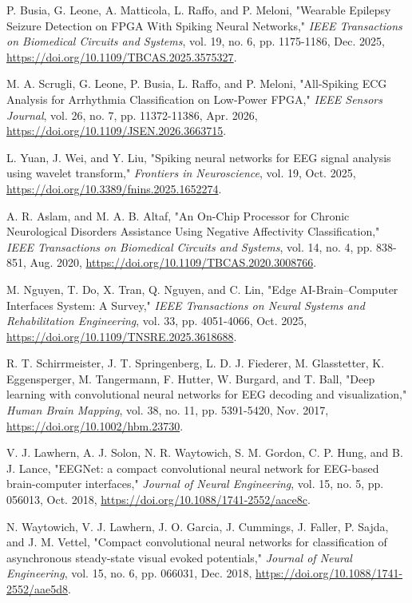  P. Busia, G. Leone, A. Matticola, L. Raffo, and P. Meloni, "Wearable Epilepsy Seizure Detection on FPGA With Spiking Neural Networks," \textit{IEEE Transactions on Biomedical Circuits and Systems}, vol. 19, no. 6, pp. 1175-1186, Dec. 2025, \url{https://doi.org/10.1109/TBCAS.2025.3575327}.

 M. A. Scrugli, G. Leone, P. Busia, L. Raffo, and P. Meloni, "All-Spiking ECG Analysis for Arrhythmia Classification on Low-Power FPGA," \textit{IEEE Sensors Journal}, vol. 26, no. 7, pp. 11372-11386, Apr. 2026, \url{https://doi.org/10.1109/JSEN.2026.3663715}.

 L. Yuan, J. Wei, and Y. Liu, "Spiking neural networks for EEG signal analysis using wavelet transform," \textit{Frontiers in Neuroscience}, vol. 19, Oct. 2025, \url{https://doi.org/10.3389/fnins.2025.1652274}.

 A. R. Aslam, and M. A. B. Altaf, "An On-Chip Processor for Chronic Neurological Disorders Assistance Using Negative Affectivity Classification," \textit{IEEE Transactions on Biomedical Circuits and Systems}, vol. 14, no. 4, pp. 838-851, Aug. 2020, \url{https://doi.org/10.1109/TBCAS.2020.3008766}.

 M. Nguyen, T. Do, X. Tran, Q. Nguyen, and C. Lin, "Edge AI-Brain–Computer Interfaces System: A Survey," \textit{IEEE Transactions on Neural Systems and Rehabilitation Engineering}, vol. 33, pp. 4051-4066, Oct. 2025, \url{https://doi.org/10.1109/TNSRE.2025.3618688}.

 R. T. Schirrmeister, J. T. Springenberg, L. D. J. Fiederer, M. Glasstetter, K. Eggensperger, M. Tangermann, F. Hutter, W. Burgard, and T. Ball, "Deep learning with convolutional neural networks for EEG decoding and visualization," \textit{Human Brain Mapping}, vol. 38, no. 11, pp. 5391-5420, Nov. 2017, \url{https://doi.org/10.1002/hbm.23730}.

 V. J. Lawhern, A. J. Solon, N. R. Waytowich, S. M. Gordon, C. P. Hung, and B. J. Lance, "EEGNet: a compact convolutional neural network for EEG-based brain-computer interfaces," \textit{Journal of Neural Engineering}, vol. 15, no. 5, pp. 056013, Oct. 2018, \url{https://doi.org/10.1088/1741-2552/aace8c}.

 N. Waytowich, V. J. Lawhern, J. O. Garcia, J. Cummings, J. Faller, P. Sajda, and J. M. Vettel, "Compact convolutional neural networks for classification of asynchronous steady-state visual evoked potentials," \textit{Journal of Neural Engineering}, vol. 15, no. 6, pp. 066031, Dec. 2018, \url{https://doi.org/10.1088/1741-2552/aae5d8}.


